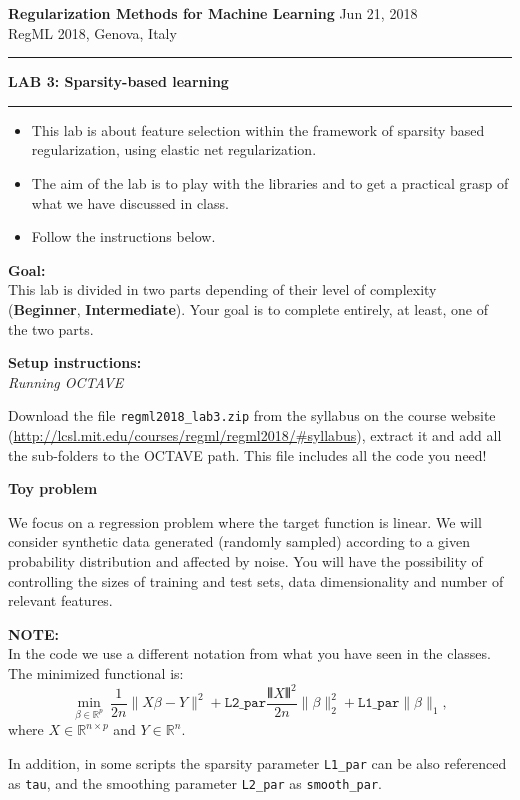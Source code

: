 \documentclass[DIN, pagenumber=false, fontsize=11pt, parskip=half]{scrartcl}
\newcommand{\mytitle}[1]{{\noindent\LARGE\textbf{#1}}}
\newcommand{\mysection}[1]{\noindent\large\textbf{#1}}
\begin{document}
\noindent\textbf{Regularization Methods for Machine Learning} \hfill Jun 21, 2018\\
RegML 2018, Genova, Italy \\ \rule{\textwidth}{1pt}

\mytitle{LAB 3: Sparsity-based learning}\\
\rule{\textwidth}{1pt}
\begin{itemize}\itemsep1pt \parskip0pt 
  \item This lab is about feature selection within the framework of sparsity based regularization, using elastic net regularization.
  \item The aim of the lab is to play with the libraries and to get a practical grasp of what we have discussed in class.
  \item Follow the instructions below. 
\end{itemize}

\begin{framed}
\textbf{\textbf{Goal}:} \\
This lab is divided in two parts depending of their level of complexity (\textbf{Beginner}, \textbf{Intermediate}). Your goal is to complete entirely, at least, one of the two parts.
\end{framed}

\begin{framed}
\textbf{\textbf{Setup instructions}:} \\
\textit{Running OCTAVE}

 Download the file \texttt{regml2018\_lab3.zip} from the syllabus on the course website (\url{http://lcsl.mit.edu/courses/regml/regml2018/\#syllabus}), extract it and add all the sub-folders to the OCTAVE path. This file includes all the code you need!
\end{framed}

\mysection{Toy problem}

We focus on a regression problem where the target function is linear. We will consider synthetic data generated (randomly sampled) according to a given probability distribution and affected by noise. You will have the possibility of controlling the sizes of training and test sets, data dimensionality and number of relevant features.

\begin{framed}
\textbf{NOTE:} \\
In the code we use a different notation from what you have seen in the classes. The minimized functional is:
\begin{equation*}
\min_{\beta\in \mathbb{R}^p} \  \frac{1}{2n} \|X\beta-Y\|^2 +
\texttt{L2\_par} \frac{\VERT X \VERT^2}{2n}\|\beta\|^2_2 +
\texttt{L1\_par}\|\beta\|_1 ,
\end{equation*}
where $X \in \mathbb{R}^{n \times p}$ and $Y \in \mathbb{R}^n$.

In addition, in some  scripts the sparsity parameter \texttt{L1\_par} can be also referenced as \texttt{tau}, and the smoothing parameter \texttt{L2\_par} as \texttt{smooth\_par}.
\end{framed}
\end{document}
